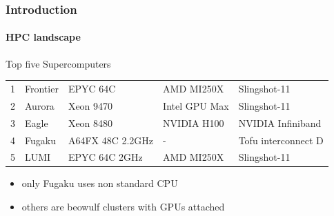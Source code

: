 \documentclass[aspectratio=169]{beamer}
\begin{document}
\begin{frame}[fragile]
\frametitle{Introduction}
\framesubtitle{HPC landscape}
\begin{block}{Top five Supercomputers}
\begin{table}
\begin{tabular}{c|l|l|l|l}
1 &	Frontier& EPYC 64C &AMD MI250X &Slingshot-11 \\
2 &	Aurora  & Xeon 9470 & Intel GPU Max&Slingshot-11 \\
3 &	Eagle & Xeon 8480 &  NVIDIA H100 & NVIDIA Infiniband \\
\rowcolor{backcolour}
4 &	Fugaku &  A64FX 48C 2.2GHz & - & Tofu interconnect D \\
5 &	LUMI &  EPYC 64C 2GHz & AMD MI250X & Slingshot-11 
\end{tabular}
\end{table}
\begin{itemize}
  \item only Fugaku uses non standard CPU
  \item others are beowulf clusters with GPUs attached
\end{itemize}
\end{block}
\end{frame}
\end{document}

